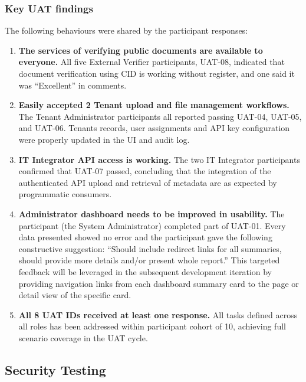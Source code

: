 \subsubsection{Key UAT findings}

The following behaviours were shared by the participant responses:

\begin{enumerate}
  \item \textbf{The services of verifying public documents are available to everyone.}
    All five External Verifier participants, UAT-08, indicated that document verification using CID is working without register, and one said it was “Excellent” in comments.

  \item \textbf{Easily accepted 2 Tenant upload and file management workflows.}
    The Tenant Administrator participants all reported passing UAT-04, UAT-05, and UAT-06. Tenants records, user assignments and API key configuration were properly updated in the UI and audit log.
    
  \item \textbf{IT Integrator API access is working.}
    The two IT Integrator participants confirmed that UAT-07 passed, concluding that the integration of the authenticated API upload and retrieval of metadata are as expected by programmatic consumers.

  \item \textbf{Administrator dashboard needs to be improved in usability.}
    The participant (the System Administrator) completed part of UAT-01. Every data presented showed no error and the participant gave the following constructive suggestion: “Should include redirect links for all summaries, should provide more details and/or present whole report.” This targeted feedback will be leveraged in the subsequent development iteration by providing navigation links from each dashboard summary card to the page or detail view of the specific card.

  \item \textbf{All 8 UAT IDs received at least one response.}
    All tasks defined across all roles has been addressed within participant cohort of 10, achieving full scenario coverage in the UAT cycle.
\end{enumerate}

\subsection{Security Testing}

